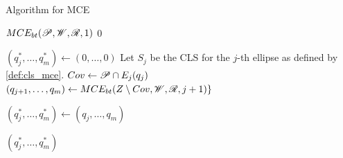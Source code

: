 \begin{algorithm}
	\caption{Algorithm for MCE}\label{algoritmo:mce}
	
	\begin{algorithmic}[1]
		
		
		\item[]
		\State \Return $MCE_{bt}(\mathscr{P}, \mathscr{W}, \mathscr{R}, 1)$
		\EndProcedure
		\State
		\State \Return $0$
		\EndIf
		
		\State $(q_j^*, \dots, q_m^*) \gets (0, \dots, 0)$
		\State Let $S_j$ be the CLS for the $j$-th ellipse as defined by \autoref{def:cls_mce}.
		\State $Cov \gets \mathscr{P} \cap E_j(q_j)$
		\State $(q_{j+1}, \dots, q_m) \gets MCE_{bt}(Z \setminus Cov, \mathscr{W}, \mathscr{R}, j+1)\}$
		
		\State $(q_j^*, \dots, q_m^*) \gets(q_j, \dots, q_m)$
		\EndIf
		\EndFor
		
		\State \Return $(q_j^*, \dots, q_m^*)$
		\EndProcedure
	\end{algorithmic}
\end{algorithm}